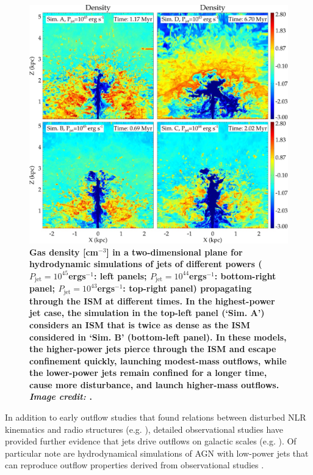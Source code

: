 \begin{figure}
    \centering
    \includegraphics[width=\linewidth]{figures/introduction/mukherjee2016_high_low_power_jets.jpeg}
    \caption[Snapshots of hydrodynamic simulations by \citet{Mukherjee2016} of a higher- and lower-power jet propagating through an ISM.]{\textbf{Gas density [cm$^{-3}$] in a two-dimensional plane for hydrodynamic simulations of jets of different powers ($P_\mathrm{jet}=10^{45}$\;erg\;s$^{-1}$: left panels; $P_\mathrm{jet}=10^{44}$\;erg\;s$^{-1}$: bottom-right panel; $P_\mathrm{jet}=10^{43}$\;erg\;s$^{-1}$: top-right panel) propagating through the ISM at different times. In the highest-power jet case, the simulation in the top-left panel (`Sim. A') considers an ISM that is twice as dense as the ISM considered in `Sim. B' (bottom-left panel). In these models, the higher-power jets pierce through the ISM and escape confinement quickly, launching modest-mass outflows, while the lower-power jets remain confined for a longer time, cause more disturbance, and launch higher-mass outflows. \textit{Image credit: \citet{Mukherjee2016}}.}}
    \label{fig: introduction: outflows: acceleration_mechanisms: mukherjee2016_high_low_power_jets}
\end{figure}

In addition to early outflow studies that found relations between disturbed NLR kinematics and radio structures (e.g. \citealt{Wilson1985, Whittle1988}), detailed observational studies have provided further evidence that jets drive outflows on galactic scales (e.g. \citealt{Morganti1998, Morganti2007, Nesvadba2008, Rosario2010a, Rosario2010b, Rosario2010c, Morganti2013_4c1250, Tadhunter2014, Mahony2016, May2017, Audibert2019, May2020, Venturi2021}). Of particular note are hydrodynamical simulations of AGN with low-power jets that can reproduce outflow properties derived from observational studies \citep{Morganti2015, Mukherjee2018, Audibert2023}.

